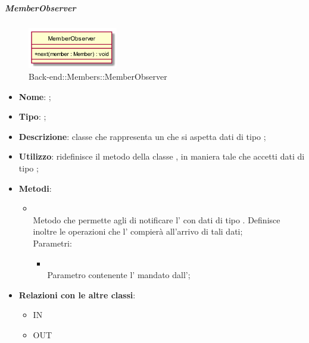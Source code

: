\hypertarget{MemberObserver_label}{\subparagraph{MemberObserver}}
\begin{figure}[h]
	\centering
	\includegraphics[width=0.35\textwidth,height=\textheight,keepaspectratio]{images/ClassMemberObserver.png}
	\caption{Back-end::Members::MemberObserver}
\end{figure}
\begin{itemize}
	\item \textbf{Nome}: ;
	\item \textbf{Tipo}: ;
	\item \textbf{Descrizione}: classe che rappresenta un  che si aspetta dati di tipo ;
	\item \textbf{Utilizzo}: ridefinisce il metodo  della classe , in maniera tale che accetti dati di tipo ;
	\item \textbf{Metodi}:
	\begin{itemize}
		\item[]  \\		Metodo che permette agli  di notificare l' con dati di tipo . Definisce inoltre le operazioni che l' compierà all'arrivo di tali dati;\\
		Parametri:
		\begin{itemize}
			\item {} \\
			Parametro contenente l' mandato dall';
		\end{itemize}
	\end{itemize}
	\item \textbf{Relazioni con le altre classi}:
	\begin{itemize}
		\item IN \hyperlink{MemberObservable_label}{}
		\item OUT \hyperlink{Member_label}{}
	\end{itemize}
\end{itemize}
\FloatBarrier

